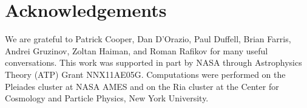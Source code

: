 \documentclass{emulateapj}
\begin{document}

\section{Acknowledgements}
We are grateful to Patrick Cooper, Dan D'Orazio, Paul Duffell, Brian Farris, Andrei Gruzinov, Zoltan Haiman, and Roman Rafikov for many useful conversations.  This work was supported in part by NASA through Astrophysics Theory (ATP) Grant NNX11AE05G.  Computations were performed on the Pleiades cluster at NASA AMES and on the Ria cluster at the Center for Cosmology and Particle Physics, New York University.





%
\end{document}

